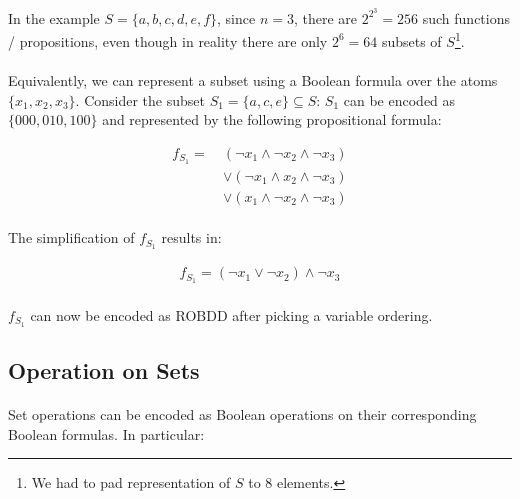 \documentclass{article}
\theoremstyle{plain}
\theoremstyle{definition}
\begin{document}
\begin{multicols}{2}
\paragraph{} In the example $S = \{a, b, c, d, e, f\}$, since $n = 3$, there are $2^{2^3} = 256$ such functions / propositions, even though in reality there are only $2^6 = 64$ subsets of $S$\footnote{We had to pad representation of $S$ to 8 elements.}. 

\paragraph{} Equivalently, we can represent a subset using a Boolean formula over the atoms $\{x_1, x_2, x_3\}$. Consider the subset $S_1 = \{a, c, e\} \subseteq S$: $S_1$ can be encoded as $\{000, 010, 100\}$ and represented by the following propositional formula:

\begin{align*}
f_{S_1} =\ &(\lnot x_1 \land \lnot x_2 \land \lnot x_3)\\
 &\lor (\lnot x_1 \land x_2 \land \lnot x_3)\\
 &\lor (x_1 \land \lnot x_2 \land \lnot x_3)
\end{align*}

\paragraph{} The simplification of $f_{S_1}$ results in:

\begin{align*}
f_{S_1} = (\lnot x_1 \lor \lnot x_2) \land \lnot x_3
\end{align*}

\paragraph{} $f_{S_1}$ can now be encoded as ROBDD after picking a variable ordering.

\subsection{Operation on Sets}

\paragraph{} Set operations can be encoded as Boolean operations on their corresponding Boolean formulas. In particular:


\end{multicols}
\end{document}
